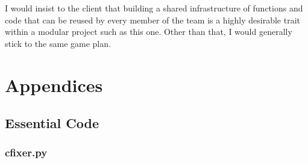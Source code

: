 \documentclass[11pt]{scrreprt}
\begin{document}
I would insist to the client that building a shared infrastructure of functions and code that can be reused by every member of the team is a highly desirable trait within a modular project such as this one. Other than that, I would generally stick to the same game plan.

\chapter{Appendices}

\section{Essential Code}

\subsection{cfixer.py}
\lstset{language=Python,breaklines=true}
\end{document}
